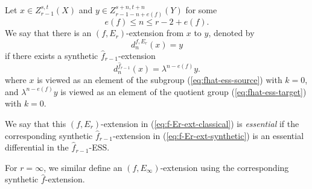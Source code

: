     
\begin{definition}\label{def:f-Er-extension}
    Let $x\in Z^{s,t}_{r-1}(X)$ and $y\in Z^{s+n,t+n}_{r-1-n+e(f)}(Y)$ for some
    $$e(f)\le n\le r-2+e(f).$$
    We say that there is an $(f,E_r)$-extension from $x$ to $y$, denoted by
    \begin{equation}\label{eq:f-Er-ext-classical}
    d_{n}^{f,E_r}(x)=y
    \end{equation}
    if there exists a synthetic $\hat f_{r-1}$-extension
    \begin{equation}\label{eq:f-Er-ext-synthetic}
        d_{n}^{\hat f_{r-1}}(x)=\lambda^{n-e(f)} y.
    \end{equation}
    where $x$ is viewed as an element of the subgroup (\ref{eq:fhat-ess-source}) with $k=0$, and $\lambda^{n-e(f)} y$ is viewed as an element of the quotient group (\ref{eq:fhat-ess-target}) with $k=0$. 

   We say that this $(f,E_r)$-extension in (\ref{eq:f-Er-ext-classical}) is \emph{essential} if the corresponding synthetic $\hat f_{r-1}$-extension in (\ref{eq:f-Er-ext-synthetic}) is an essential differential in the $\hat f_{r-1}$-ESS.
    
    For $r=\infty$, we similar define an $(f,E_\infty)$-extension using the corresponding synthetic $\hat f$-extension.
\end{definition}



